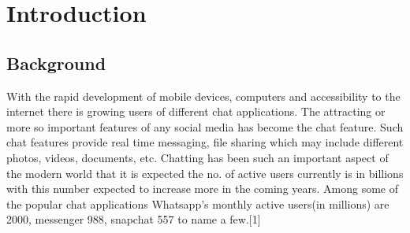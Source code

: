 {
\KECadjusttocspacings %
\makeatletter
\def\@makeschapterhead#1{%
  {\newpage \parindent \z@ \raggedright
    \normalfont
    \interlinepenalty\@M
    \center \fontsize{16pt}{1} \bfseries \MakeUppercase{#1}\par\nobreak
    \vskip 18\p@ %
  }}
\makeatother 

\tableofcontents %
\listoffigures %
}


\newpage
{} %

\chapter{Introduction}
\section{Background}\label{sec:bkgrnd}%
With the rapid development of mobile devices, computers and accessibility to the internet there is growing users of different chat applications. The attracting or more so important features of any social media has become the chat feature. Such chat features provide real time messaging, file sharing which may include different photos, videos, documents, etc. Chatting has been such an important aspect of the modern world that it is expected the no. of active users currently is in billions with this number expected to increase more in the coming years. Among some of the popular chat applications Whatsapp’s monthly active users(in millions) are 2000, messenger 988, snapchat 557 to name a few.[1]


